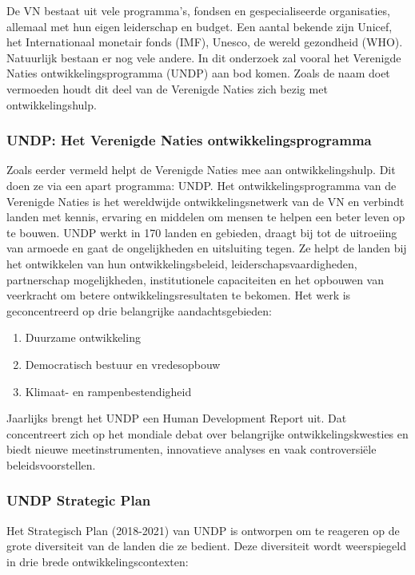 De VN bestaat uit vele programma's, fondsen en gespecialiseerde organisaties, allemaal met hun eigen leiderschap en budget. Een aantal bekende zijn Unicef, het Internationaal monetair fonds (IMF), Unesco, de wereld gezondheid (WHO). Natuurlijk bestaan er nog vele andere. In dit onderzoek zal vooral het Verenigde Naties ontwikkelingsprogramma (UNDP) aan bod komen. Zoals de naam doet vermoeden houdt dit deel van de Verenigde Naties zich bezig met ontwikkelingshulp.

\subsubsection{UNDP: Het Verenigde Naties ontwikkelingsprogramma}
Zoals eerder vermeld helpt de Verenigde Naties mee aan ontwikkelingshulp. Dit doen ze via een apart programma: UNDP. Het ontwikkelingsprogramma van de Verenigde Naties is het wereldwijde ontwikkelingsnetwerk van de VN en verbindt landen met kennis, ervaring en middelen om mensen te helpen een beter leven op te bouwen. UNDP werkt in 170 landen en gebieden, draagt bij tot de uitroeiing van armoede en gaat de ongelijkheden en uitsluiting tegen. Ze helpt de landen bij het ontwikkelen van hun ontwikkelingsbeleid, leiderschapsvaardigheden, partnerschap mogelijkheden, institutionele capaciteiten en het opbouwen van veerkracht om betere ontwikkelingsresultaten te bekomen. \autocite{DevelopmentProgram2020}
Het werk is geconcentreerd op drie belangrijke aandachtsgebieden:

\begin{enumerate}
\item Duurzame ontwikkeling
\item Democratisch bestuur en vredesopbouw
\item Klimaat- en rampenbestendigheid
\end{enumerate}

 Jaarlijks brengt het UNDP een Human Development Report uit. Dat concentreert zich op het mondiale debat over belangrijke ontwikkelingskwesties en biedt nieuwe meetinstrumenten, innovatieve analyses en vaak controversiële beleidsvoorstellen. \autocite{DevelopmentProgram2020} 

\subsubsection{UNDP Strategic Plan}
Het Strategisch Plan (2018-2021) van UNDP is ontworpen om te reageren op de grote diversiteit van de landen die ze bedient. Deze diversiteit wordt weerspiegeld in drie brede ontwikkelingscontexten: \autocite{DevelopmentProgram2020}

